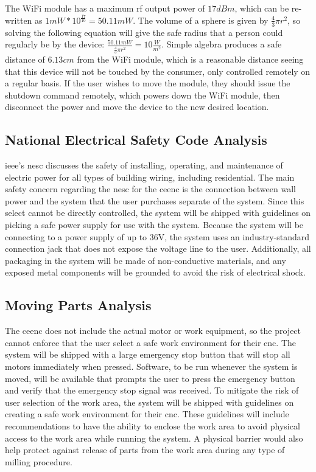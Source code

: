 The WiFi module has a maximum \gls{rf} output power of $17dBm$, which can be re-written as $1mW*10^{\frac{17}{10}}=50.11mW$.
The volume of a sphere is given by $\frac{4}{3}\pi r^2$, so solving the following equation will give the safe radius that a person could regularly be by the device: $\frac{50.11mW}{\frac{4}{3}\pi r^2}=10\frac{W}{m^2}$.
Simple algebra produces a safe distance of $6.13cm$ from the WiFi module, which is a reasonable distance seeing that this device will not be touched by the consumer, only controlled remotely on a regular basis. 
If the user wishes to move the module, they should issue the shutdown command remotely, which powers down the WiFi module, then disconnect the power and move the device to the new desired location.

\subsection{National Electrical Safety Code Analysis}
\gls{ieee}'s \gls{nesc}\cite{ieeenesc} discusses the safety of installing, operating, and maintenance of electric power for all types of building wiring, including residential.
The main safety concern regarding the \gls{nesc} for the \gls{ceenc} is the connection between wall power and the system that the user purchases separate of the system.
Since this select cannot be directly controlled, the system will be shipped with guidelines on picking a safe power supply for use with the system.
Because the system will be connecting to a power supply of up to 36V, the system uses an industry-standard connection jack that does not expose the voltage line to the user.
Additionally, all packaging in the system will be made of non-conductive materials, and any exposed metal components will be grounded to avoid the risk of electrical shock\cite{ieeenesc}.

\subsection{Moving Parts Analysis}
The \gls{ceenc} does not include the actual motor or work equipment, so the project cannot enforce that the user select a safe work environment for their \gls{cnc}.
The system will be shipped with a large emergency stop button that will stop all motors immediately when pressed.
Software, to be run whenever the system is moved, will be available that prompts the user to press the emergency button and verify that the emergency stop signal was received.
To mitigate the risk of user selection of the work area, the system will be shipped with guidelines on creating a safe work environment for their \gls{cnc}.
These guidelines will include recommendations to have the ability to enclose the work area to avoid physical access to the work area while running the system.
A physical barrier would also help protect against release of parts from the work area during any type of milling procedure.

